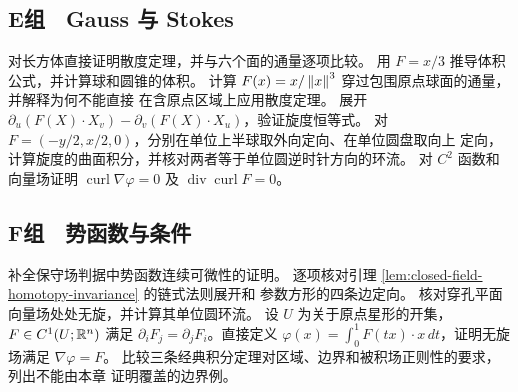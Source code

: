 \subsection*{E组　Gauss 与 Stokes}
\begin{enumerate}[label=\textbf{\thechapter.\arabic*.},resume]
 对长方体直接证明散度定理，并与六个面的通量逐项比较。
 用 \(F=x/3\) 推导体积公式，并计算球和圆锥的体积。
 计算 \(F(x)=x/\left\lVert x\right\rVert^3\) 穿过包围原点球面的通量，并解释为何不能直接
 在含原点区域上应用散度定理。
 展开
 \(\partial_u(F(X)\cdot X_v)-\partial_v(F(X)\cdot X_u)\)，验证旋度恒等式。
 对 $F=(-y/2,x/2,0)$，分别在单位上半球取外向定向、在单位圆盘取向上
 定向，计算旋度的曲面积分，并核对两者等于单位圆逆时针方向的环流。
 对 \(C^2\) 函数和向量场证明
 \(\operatorname{curl}\nabla\varphi=0\) 及
 \(\operatorname{div}\operatorname{curl}F=0\)。
\end{enumerate}

\subsection*{F组　势函数与条件}
\begin{enumerate}[label=\textbf{\thechapter.\arabic*.},resume]
 补全保守场判据中势函数连续可微性的证明。
 逐项核对引理 \ref{lem:closed-field-homotopy-invariance} 的链式法则展开和
 参数方形的四条边定向。
 核对穿孔平面向量场处处无旋，并计算其单位圆环流。
 设 $U$ 为关于原点星形的开集，$F\in C^1(U;\mathbb{R}^n)$ 满足
 $\partial_iF_j=\partial_jF_i$。直接定义
 \(\varphi(x)=\int_0^1F(tx)\cdot x\,dt\)，证明无旋场满足
 \(\nabla\varphi=F\)。
 比较三条经典积分定理对区域、边界和被积场正则性的要求，列出不能由本章
 证明覆盖的边界例。
\end{enumerate}
